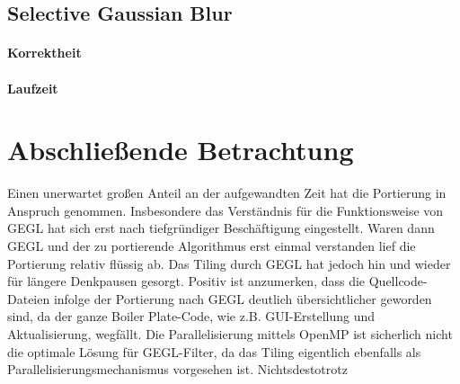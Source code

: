 \documentclass[10pt,a4paper]{article}
\begin{document}





\subsection{Selective Gaussian Blur}
\paragraph{Korrektheit}
\paragraph{Laufzeit}
\section{Abschließende Betrachtung}
Einen unerwartet großen Anteil an der aufgewandten Zeit hat die Portierung in Anspruch genommen. Insbesondere das Verständnis für die Funktionsweise von GEGL hat sich erst nach tiefgründiger Beschäftigung eingestellt. Waren dann GEGL und der zu portierende Algorithmus erst einmal verstanden lief die Portierung relativ flüssig ab. Das Tiling durch GEGL hat jedoch hin und wieder für längere Denkpausen gesorgt.
Positiv ist anzumerken, dass die Quellcode-Dateien infolge der Portierung nach GEGL deutlich übersichtlicher geworden sind, da der ganze Boiler Plate-Code, wie z.B. GUI-Erstellung und Aktualisierung, wegfällt.
Die Parallelisierung mittels OpenMP ist sicherlich nicht die optimale Lösung für GEGL-Filter, da das Tiling eigentlich ebenfalls als Parallelisierungsmechanismus vorgesehen ist. Nichtsdestotrotz 
\end{document}
